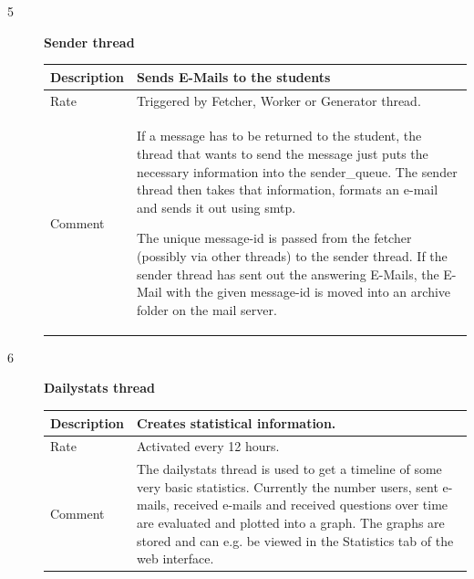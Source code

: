 \begin{description}
	\item [5] \textbf{Sender thread} \\
    \begin{tabular}{|p{2cm}|p{11cm}|}
        \hline
        Description & Sends E-Mails to the students \\
        \hline
        Rate & Triggered by Fetcher, Worker or Generator thread. \\
		\hline
		Comment & If a message has to be returned to the student, the thread that 
		wants to send the message just puts the necessary information into the 
		sender\_queue. The sender thread then takes that information, formats an 
		e-mail and sends it out using \gls{smtp}.

        The unique message-id is passed from the fetcher (possibly via other 
		threads) to the sender thread. If the sender thread has sent out the 
		answering E-Mails, the E-Mail with the given message-id is moved into an 
		archive folder on the mail server.
        \\
        \hline
    \end{tabular}

	\newpage 

	\item [6] \textbf{Dailystats thread} \\
    \begin{tabular}{|p{2cm}|p{11cm}|}
        \hline
        Description & Creates statistical information. \\
        \hline
        Rate & Activated every 12 hours. \\
		\hline
		Comment & The dailystats thread is used to get a timeline of some very basic statistics.
		Currently the number users, sent e-mails, received e-mails and received questions
		over time are evaluated and plotted into a graph. The graphs are stored and 
		can e.g. be viewed in the Statistics tab of the web interface.
        \\
        \hline

    \end{tabular}
\end{description}

